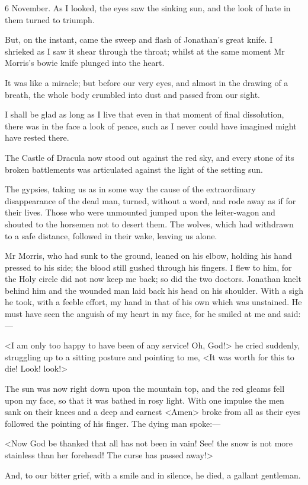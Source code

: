 \begin{diary}{6 November.}
As I looked, the eyes saw the sinking sun, and the look of hate in them turned to triumph.

But, on the instant, came the sweep and flash of Jonathan's great knife. I shrieked as I saw it shear through the throat; whilst at the same moment Mr Morris's bowie knife plunged into the heart.

It was like a miracle; but before our very eyes, and almost in the drawing of a breath, the whole body crumbled into dust and passed from our sight.

I shall be glad as long as I live that even in that moment of final dissolution, there was in the face a look of peace, such as I never could have imagined might have rested there.

The Castle of Dracula now stood out against the red sky, and every stone of its broken battlements was articulated against the light of the setting sun.

The gypsies, taking us as in some way the cause of the extraordinary disappearance of the dead man, turned, without a word, and rode away as if for their lives. Those who were unmounted jumped upon the leiter-wagon and shouted to the horsemen not to desert them. The wolves, which had withdrawn to a safe distance, followed in their wake, leaving us alone.

Mr Morris, who had sunk to the ground, leaned on his elbow, holding his hand pressed to his side; the blood still gushed through his fingers. I flew to him, for the Holy circle did not now keep me back; so did the two doctors. Jonathan knelt behind him and the wounded man laid back his head on his shoulder. With a sigh he took, with a feeble effort, my hand in that of his own which was unstained. He must have seen the anguish of my heart in my face, for he smiled at me and said:—

<I am only too happy to have been of any service! Oh, God!> he cried suddenly, struggling up to a sitting posture and pointing to me, <It was worth for this to die! Look! look!>

The sun was now right down upon the mountain top, and the red gleams fell upon my face, so that it was bathed in rosy light. With one impulse the men sank on their knees and a deep and earnest <Amen> broke from all as their eyes followed the pointing of his finger. The dying man spoke:—

<Now God be thanked that all has not been in vain! See! the snow is not more stainless than her forehead! The curse has passed away!>

And, to our bitter grief, with a smile and in silence, he died, a gallant gentleman.
	\end{diary}

